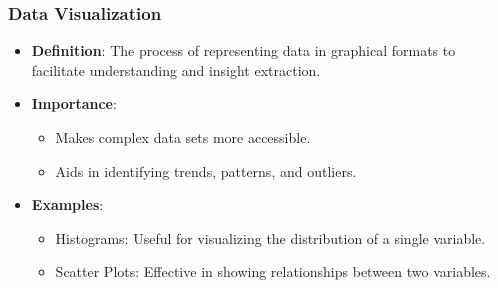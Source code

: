 \documentclass[aspectratio=169]{beamer}
\begin{document}
\begin{frame}[fragile]
    \frametitle{Data Visualization}
    \begin{itemize}
        \item \textbf{Definition}: The process of representing data in graphical formats to facilitate understanding and insight extraction.
        \item \textbf{Importance}:
            \begin{itemize}
                \item Makes complex data sets more accessible.
                \item Aids in identifying trends, patterns, and outliers.
            \end{itemize}
        \item \textbf{Examples}:
            \begin{itemize}
                \item Histograms: Useful for visualizing the distribution of a single variable.
                \item Scatter Plots: Effective in showing relationships between two variables.
            \end{itemize}
    \end{itemize}
\end{frame}
\end{document}
